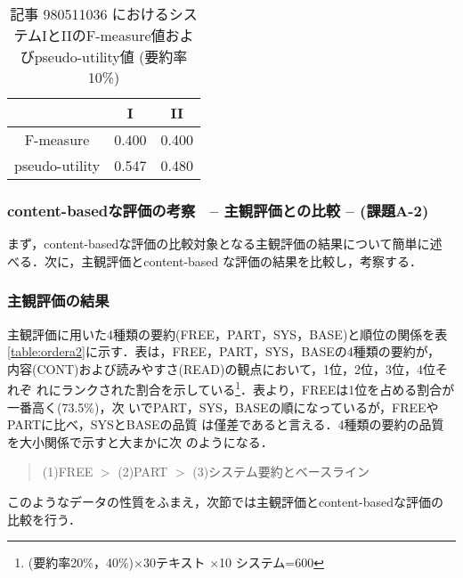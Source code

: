 \begin{table}[t]
\begin{center}
\caption{記事 980511036 におけるシステムIとIIのF-measure値およびpseudo-utility値 (要約率10\%)\label{ivsii2}}
\begin{tabular}{|c|c|c|}\hline
               & I     &   II \\ \hline\hline
F-measure      & 0.400 & 0.400 \\ \hline
pseudo-utility & 0.547 & 0.480 \\ \hline
\end{tabular}
\end{center}
\end{table}

\subsubsection{content-basedな評価の考察　-- 主観評価との比較 -- (課題A-2)}

まず，content-basedな評価の比較対象となる主観評価の結果について簡単に述
べる．次に，主観評価とcontent-based な評価の結果を比較し，考察する．

\subsubsection*{主観評価の結果}

主観評価に用いた4種類の要約(FREE，PART，SYS，BASE)と順位の関係を表
\ref{table:ordera2}に示す．表は，FREE，PART，SYS，BASEの4種類の要約が，
内容(CONT)および読みやすさ(READ)の観点において，1位，2位，3位，4位それぞ
れにランクされた割合を示している\footnote{(要約率20\%，40\%)×30テキスト
×10 システム=600}．表より，FREEは1位を占める割合が一番高く(73.5\%)，次
いでPART，SYS，BASEの順になっているが，FREEやPARTに比べ，SYSとBASEの品質
は僅差であると言える．4種類の要約の品質を大小関係で示すと大まかに次
のようになる．

\begin{quote}
 (1)FREE $>$ (2)PART $>$ (3)システム要約とベースライン
\end{quote}

\begin{flushleft}
このようなデータの性質をふまえ，次節では主観評価とcontent-basedな評価の
比較を行う．
\end{flushleft}


